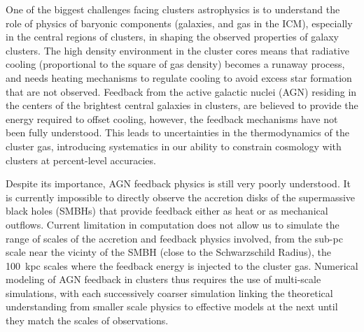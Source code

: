 \documentclass[letterpaper,11pt]{article}
\begin{document}
One of the biggest challenges facing clusters astrophysics is to understand the role of physics of baryonic components (galaxies, and gas in the ICM), especially in the central regions of clusters, in shaping the observed  properties of galaxy clusters. The high density environment in the cluster cores means that radiative cooling (proportional to the square of gas density) becomes a runaway process, and needs heating mechanisms to regulate cooling to avoid excess star formation that are not observed. Feedback from the active galactic nuclei (AGN) residing in the centers of the brightest central galaxies in clusters, are believed to provide the energy required to offset cooling, however, the feedback mechanisms have not been fully understood. This leads to uncertainties in the thermodynamics of the cluster gas, introducing systematics in our ability to constrain cosmology with clusters at percent-level accuracies.  

Despite its importance, AGN feedback physics is still very poorly understood. It is currently impossible to directly observe the accretion disks of the supermassive black holes (SMBHs) that provide feedback either as heat or as mechanical outflows. Current limitation in computation does not allow us to simulate the range of scales of the accretion and feedback physics involved, from the sub-pc scale near the vicinty of the SMBH (close to the Schwarzschild Radius), the 100~kpc scales where the feedback energy is injected to the cluster gas.  %
Numerical modeling of AGN feedback in clusters thus requires the use of multi-scale simulations, with each successively coarser simulation linking the theoretical understanding from smaller scale physics to effective models at the next until they match the scales of observations.
\end{document}
